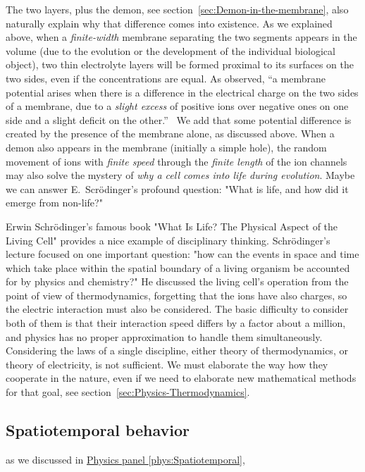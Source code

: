 The two layers, plus the demon, see section~\ref{sec:Demon-in-the-membrane}, also naturally explain why that difference
comes into existence. As we explained above, when a \emph{finite-width}
membrane separating the two segments appears in the volume (due to
the evolution or the development of the individual biological object),
two thin electrolyte layers will be formed proximal to its surfaces
on the two sides, even if the concentrations are equal. As observed,
``a membrane potential arises when there is a difference in the electrical
charge on the two sides of a membrane, due to a \emph{slight excess}
of positive ions over negative ones on one side and a slight deficit
on the other.''~\cite{NeuroscienceBook:2001} We add that some potential
difference is created by the presence of the membrane alone, as discussed
above. When a demon also appears in the membrane (initially a simple
hole), the random movement of ions with \emph{finite speed }through
the \emph{finite length} of the ion channels may also solve the mystery
of \emph{\hypertarget{CellToLife}{why a cell comes into life} during evolution}.
Maybe we can answer E.~Scrödinger's profound question: "What is life, and how did it emerge from non-life?"


Erwin Schrödinger's famous book "What Is Life? The Physical Aspect of the Living Cell"
provides a nice example of disciplinary thinking.
Schrödinger's lecture focused on one important question:
"how can the events in space and time which take place within the spatial boundary
of a living organism be accounted for by physics and chemistry?"
He discussed the living cell's operation from the point of view of thermodynamics,
forgetting that the ions have also charges, so the electric interaction
must also be considered. The basic difficulty to consider both of them is
that their interaction speed differs by a factor about a million, and
physics has no proper approximation to handle them simultaneously.
Considering the laws of a single discipline, either theory of thermodynamics,
or theory of electricity, is not sufficient. We must elaborate the way
how they cooperate in the nature, even if we need to elaborate new mathematical
methods for that goal, see section~\ref{sec:Physics-Thermodynamics}.


\subsection{Spatiotemporal behavior\label{sec:Physiology-Spatiotemporal}}

as we discussed in \hyperlink{phys:Spatiotemporal}{Physics panel \ref{phys:Spatiotemporal}},
